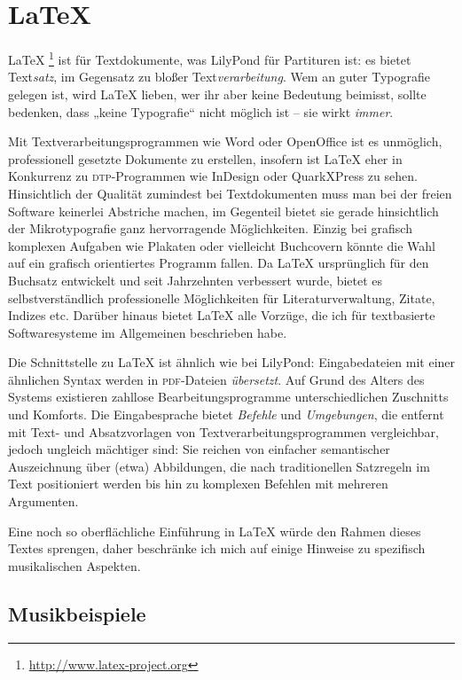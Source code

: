 \documentclass[DIV=12]{scrreprt}
\begin{document}
\chapter{\LaTeX}
\label{chap:pt_latex}

\LaTeX%
\footnote{\url{http://www.latex-project.org}}
ist für Textdokumente, was LilyPond für Partituren ist:
es bietet Text\emph{satz}, im Gegensatz zu bloßer Text\emph{verarbeitung}.
Wem an guter Typografie gelegen ist, wird \LaTeX{} lieben, wer ihr aber keine Bedeutung beimisst, sollte bedenken, dass „keine Typografie“ nicht möglich ist -- sie wirkt \emph{immer}. 

Mit Textverarbeitungsprogrammen wie Word oder OpenOffice ist es unmöglich, professionell gesetzte Dokumente zu erstellen, insofern ist \LaTeX{} eher in Konkurrenz zu \textsc{dtp}-Programmen wie InDesign oder QuarkXPress zu sehen.
Hinsichtlich der Qualität zumindest bei Textdokumenten muss man bei der freien Software keinerlei Abstriche machen, im Gegenteil bietet sie gerade hinsichtlich der Mikrotypografie ganz hervorragende Möglichkeiten.
Einzig bei grafisch komplexen Aufgaben wie Plakaten oder vielleicht Buchcovern könnte die Wahl auf ein grafisch orientiertes Programm fallen.
Da \LaTeX{} ursprünglich für den Buchsatz entwickelt und seit Jahrzehnten verbessert wurde, bietet es selbstverständlich professionelle Möglichkeiten für Literaturverwaltung, Zitate, Indizes etc.
Darüber hinaus bietet \LaTeX{} alle Vorzüge, die ich für textbasierte Softwaresysteme im Allgemeinen beschrieben habe.

Die Schnittstelle zu \LaTeX{} ist ähnlich wie bei LilyPond:
Eingabedateien mit einer ähnlichen Syntax werden in \textsc{pdf}-Dateien \emph{übersetzt}.
Auf Grund des Alters des Systems existieren zahllose Bearbeitungsprogramme unterschiedlichen Zuschnitts und Komforts.
Die Eingabesprache bietet \emph{Befehle} und \emph{Umgebungen}, die entfernt mit Text- und Absatzvorlagen von Textverarbeitungsprogrammen vergleichbar, jedoch ungleich mächtiger sind:
Sie reichen von einfacher semantischer Auszeichnung über (etwa) Abbildungen, die nach traditionellen Satzregeln im Text positioniert werden bis hin zu komplexen Befehlen mit mehreren Argumenten.

Eine noch so oberflächliche Einführung in \LaTeX{} würde den Rahmen dieses Textes sprengen, daher beschränke ich mich auf einige Hinweise zu spezifisch musikalischen Aspekten.


\section{Musikbeispiele}
\label{sec:pt_music-examples}
\end{document}
